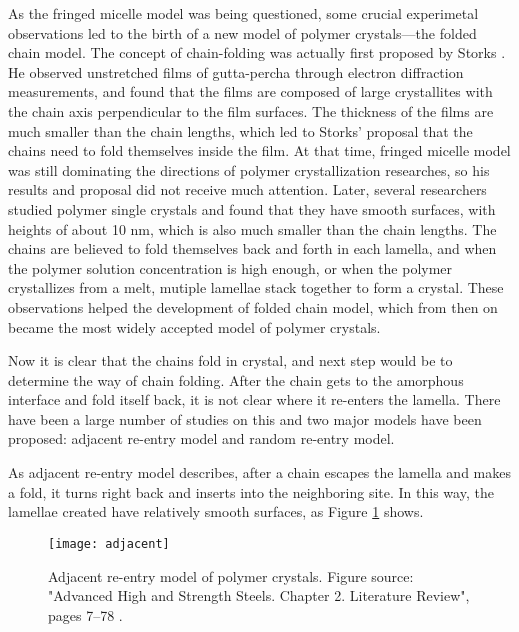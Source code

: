 As the fringed micelle model was being questioned, some crucial experimetal observations led to the birth of a new model of polymer crystals---the folded chain model. The concept of chain-folding was actually first proposed by Storks \cite{Storks1938}. He observed unstretched films of gutta-percha through electron diffraction measurements, and found that the films are composed of large crystallites with the chain axis perpendicular to the film surfaces. The thickness of the films are much smaller than the chain lengths, which led to Storks' proposal that the chains need to fold themselves inside the film.  At that time, fringed micelle model was still dominating the directions of polymer crystallization researches, so his results and proposal did not receive much attention. Later, several researchers \cite{JACCODINE1955,Till1957,Keller1957} studied polymer single crystals and found that they have smooth surfaces, with heights of about 10 nm, which is also much smaller than the chain lengths. The chains are believed to fold themselves back and forth in each lamella, and when the polymer solution concentration is high enough, or when the polymer crystallizes from a melt, mutiple lamellae stack together to form a crystal. These observations helped the development of folded chain model, which from then on became the most widely accepted model of polymer crystals. 

Now it is clear that the chains fold in crystal, and next step would be to determine the way of chain folding. After the chain gets to the amorphous interface and fold itself back, it is not clear where it re-enters the lamella. There have been a large number of studies on this \cite{Kovacs1975,Yoon1979,Keller1979} and two major models have been proposed: adjacent re-entry model and random re-entry model.

As adjacent re-entry model describes, after a chain escapes the lamella and makes a fold, it turns right back and inserts into the neighboring site. In this way, the lamellae created have relatively smooth surfaces, as Figure \ref{fig:adjacent} shows.

\begin{figure}[H]
\center
\vspace{1 cm}
\texttt{[image: adjacent]}
\caption[Adjacent re-entry model of polymer crystals.]{Adjacent re-entry model of polymer crystals. Figure source: "Advanced High and Strength Steels. Chapter 2. Literature Review", pages 7–78 \cite{High}.}
\label{fig:adjacent}
\end{figure}


